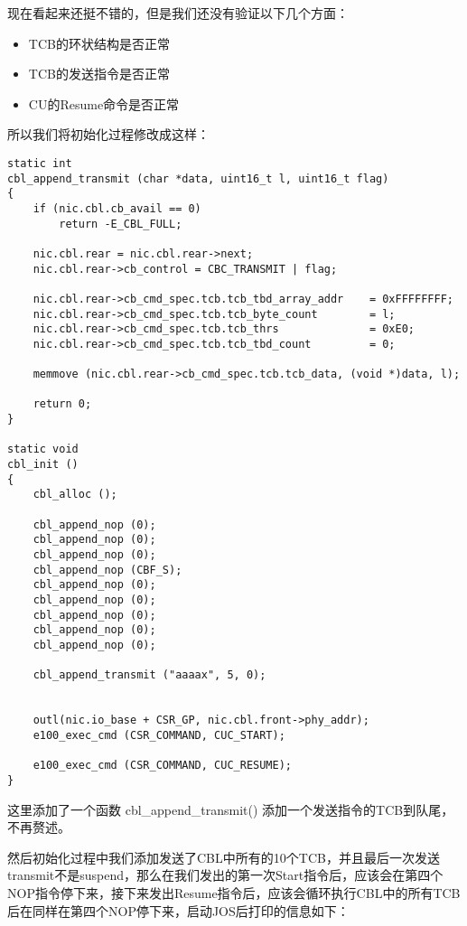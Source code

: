 \documentclass{article}
\newcommand{\funcname}[1]{{\ttfamily \small #1}}
\begin{document}
\begin{CJK*}{UTF8}{gkai}
现在看起来还挺不错的，但是我们还没有验证以下几个方面：

\begin{itemize}
\item{TCB的环状结构是否正常}
\item{TCB的发送指令是否正常}
\item{CU的Resume命令是否正常}
\end{itemize}

所以我们将初始化过程修改成这样：

\begin{lstlisting}[style=ccode, title={\scriptsize \ttfamily \bfseries kern/e100.c}]
static int
cbl_append_transmit (char *data, uint16_t l, uint16_t flag)
{
    if (nic.cbl.cb_avail == 0)
        return -E_CBL_FULL;

    nic.cbl.rear = nic.cbl.rear->next;
    nic.cbl.rear->cb_control = CBC_TRANSMIT | flag;
    
    nic.cbl.rear->cb_cmd_spec.tcb.tcb_tbd_array_addr    = 0xFFFFFFFF;
    nic.cbl.rear->cb_cmd_spec.tcb.tcb_byte_count        = l;
    nic.cbl.rear->cb_cmd_spec.tcb.tcb_thrs              = 0xE0;
    nic.cbl.rear->cb_cmd_spec.tcb.tcb_tbd_count         = 0;

    memmove (nic.cbl.rear->cb_cmd_spec.tcb.tcb_data, (void *)data, l);

    return 0;
}

static void
cbl_init () 
{
    cbl_alloc ();

    cbl_append_nop (0);
    cbl_append_nop (0);
    cbl_append_nop (0);
    cbl_append_nop (CBF_S);
    cbl_append_nop (0);
    cbl_append_nop (0);
    cbl_append_nop (0);
    cbl_append_nop (0);
    cbl_append_nop (0);

    cbl_append_transmit ("aaaax", 5, 0);


    outl(nic.io_base + CSR_GP, nic.cbl.front->phy_addr);
    e100_exec_cmd (CSR_COMMAND, CUC_START); 

    e100_exec_cmd (CSR_COMMAND, CUC_RESUME); 
}
\end{lstlisting}

这里添加了一个函数 \funcname{cbl\_append\_transmit()} 添加一个发送指令的TCB到队尾，不再赘述。

然后初始化过程中我们添加发送了CBL中所有的10个TCB，并且最后一次发送transmit不是suspend，那么在我们发出的第一次Start指令后，应该会在第四个NOP指令停下来，接下来发出Resume指令后，应该会循环执行CBL中的所有TCB后在同样在第四个NOP停下来，启动JOS后打印的信息如下：



\end{CJK*}
\end{document}
